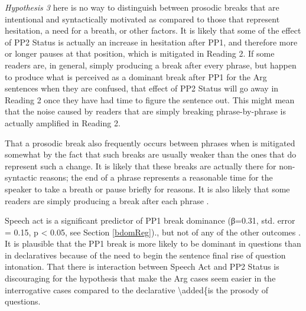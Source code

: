 \documentclass[12pt,oneside]{book}
\begin{document}
\emph{Hypothesis 3} here is no way to distinguish between prosodic breaks that are intentional and syntactically motivated as compared to those that represent hesitation, a need for a breath, or other factors. It is likely that some of the effect of PP2 Status is actually an increase in hesitation after PP1, and therefore more or longer pauses at that position, which is mitigated in Reading 2. If some readers are, in general, simply producing a break after every phrase, but happen to produce what is perceived as a dominant break after PP1 for the Arg sentences when they are confused, that  effect of PP2 Status will go away in Reading 2 once they have had time to figure the sentence out. This might mean that the noise caused by readers that are simply breaking phrase-by-phrase is actually amplified in Reading 2.

That a prosodic break also frequently occurs between phrases when  is mitigated somewhat by the fact that such breaks are usually weaker than the ones that do represent such a change. It is likely that these breaks are actually there for non-syntactic reasons; the end of a phrase represents a reasonable time for the speaker to take a breath or pause briefly for  reasons. It is also likely that some readers are simply producing a break after each phrase .

Speech act is a significant predictor of PP1 break dominance (β=0.31, std. error = 0.15, p \textless{} 0.05, see Section \ref{bdomReg})., but not of any of the other  outcomes . It is plausible that the PP1 break is more likely to be dominant in questions than in declaratives because of the need to begin the sentence final rise of question intonation. That there is  interaction between Speech Act and PP2 Status is discouraging for the hypothesis that  make the Arg cases seem easier in the interrogative cases compared to the declarative \textbackslash{}added\{is the prosody of questions.
\end{document}
